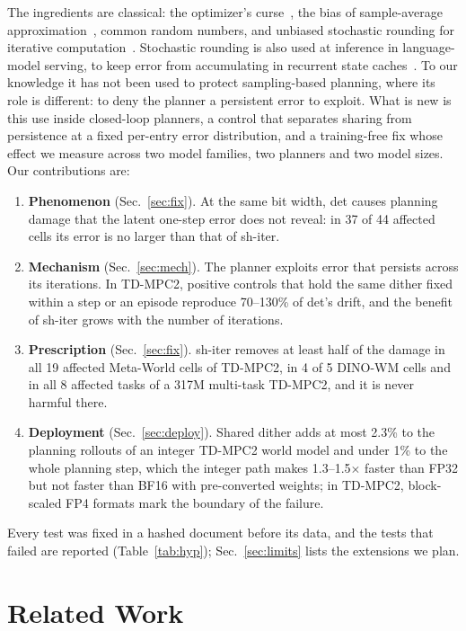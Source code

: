\documentclass[conference]{IEEEtran}
\newcommand{\dtm}{\textsf{det}\xspace}
\newcommand{\shiter}{\textsf{sh-iter}\xspace}
\newcommand{\extplan}{Sec.~\ref{sec:limits} lists the extensions we plan}
\newcommand{\extplan}{Sec.~\ref{sec:limits} lists the extensions we propose for Stage 2}
\begin{document}
The ingredients are classical: the optimizer's curse~\cite{smith2006curse}, the bias of sample-average approximation~\cite{kleywegt2002saa}, common random numbers, and unbiased stochastic rounding for iterative computation~\cite{gupta2015limited, croci2022sr}. Stochastic rounding is also used at inference in language-model serving, to keep error from accumulating in recurrent state caches~\cite{nvidia2026nemotron, khilar2026dither}. To our knowledge it has not been used to protect sampling-based planning, where its role is different: to deny the planner a persistent error to exploit. What is new is this use inside closed-loop planners, a control that separates sharing from persistence at a fixed per-entry error distribution, and a training-free fix whose effect we measure across two model families, two planners and two model sizes. Our contributions are:
\begin{enumerate}
\item \textbf{Phenomenon} (Sec.~\ref{sec:fix}). At the same bit width, \dtm causes planning damage that the latent one-step error does not reveal: in 37 of 44 affected cells its error is no larger than that of \shiter.
\item \textbf{Mechanism} (Sec.~\ref{sec:mech}). The planner exploits error that persists across its iterations. In TD-MPC2, positive controls that hold the same dither fixed within a step or an episode reproduce 70--130\% of \dtm's drift, and the benefit of \shiter grows with the number of iterations.
\item \textbf{Prescription} (Sec.~\ref{sec:fix}). \shiter removes at least half of the damage in all 19 affected Meta-World cells of TD-MPC2, in 4 of 5 DINO-WM cells and in all 8 affected tasks of a 317M multi-task TD-MPC2, and it is never harmful there.
\item \textbf{Deployment} (Sec.~\ref{sec:deploy}). Shared dither adds at most 2.3\% to the planning rollouts of an integer TD-MPC2 world model and under 1\% to the whole planning step, which the integer path makes 1.3--1.5$\times$ faster than FP32 but not faster than BF16 with pre-converted weights; in TD-MPC2, block-scaled FP4 formats mark the boundary of the failure.
\end{enumerate}
Every test was fixed in a hashed document before its data, and the tests that failed are reported (Table~\ref{tab:hyp}); \extplan.

\section{Related Work}
\label{sec:related}
\end{document}
